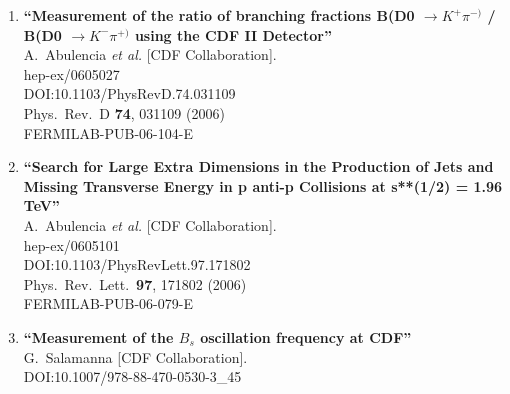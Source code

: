 \documentclass{article}
\begin{document}
\begin{enumerate}
\item%
{\bf ``Measurement of the ratio of branching fractions B(D0 $\to K^{+} \pi^{-)}$ / B(D0 $\to K^{-} \pi^{+)}$ using the CDF II Detector''}
  \\{}A.~Abulencia {\it et al.} [CDF Collaboration].
  \\{}hep-ex/0605027
  \\{}DOI:10.1103/PhysRevD.74.031109
  \\{}Phys.\ Rev.\ D {\bf 74}, 031109 (2006)
  \\{}FERMILAB-PUB-06-104-E
\item%
{\bf ``Search for Large Extra Dimensions in the Production of Jets and Missing Transverse Energy in p anti-p Collisions at s**(1/2) = 1.96 TeV''}
  \\{}A.~Abulencia {\it et al.} [CDF Collaboration].
  \\{}hep-ex/0605101
  \\{}DOI:10.1103/PhysRevLett.97.171802
  \\{}Phys.\ Rev.\ Lett.\  {\bf 97}, 171802 (2006)
  \\{}FERMILAB-PUB-06-079-E
\item%
{\bf ``Measurement of the $B_s$ oscillation frequency at CDF''}
  \\{}G.~Salamanna [CDF Collaboration].
  \\{}DOI:10.1007/978-88-470-0530-3\_45


\end{enumerate}
\end{document}
